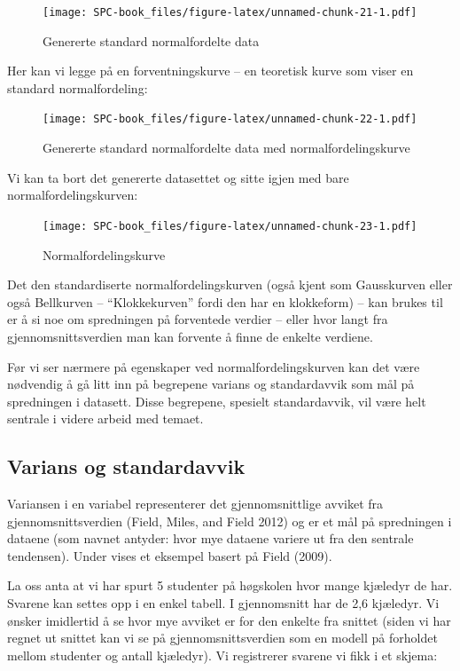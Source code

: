 \documentclass[
]{book}
\begin{document}
\begin{figure}
\centering
\texttt{[image: SPC-book\_files/figure-latex/unnamed-chunk-21-1.pdf]}
\caption{\label{fig:unnamed-chunk-21}Genererte standard normalfordelte data}
\end{figure}

Her kan vi legge på en forventningskurve -- en teoretisk kurve som viser en standard normalfordeling:

\begin{figure}
\centering
\texttt{[image: SPC-book\_files/figure-latex/unnamed-chunk-22-1.pdf]}
\caption{\label{fig:unnamed-chunk-22}Genererte standard normalfordelte data med normalfordelingskurve}
\end{figure}

Vi kan ta bort det genererte datasettet og sitte igjen med bare normalfordelingskurven:

\begin{figure}
\centering
\texttt{[image: SPC-book\_files/figure-latex/unnamed-chunk-23-1.pdf]}
\caption{\label{fig:unnamed-chunk-23}Normalfordelingskurve}
\end{figure}

Det den standardiserte normalfordelingskurven (også kjent som Gausskurven eller også Bellkurven -- ``Klokkekurven'' fordi den har en klokkeform) -- kan brukes til er å si noe om spredningen på forventede verdier -- eller hvor langt fra gjennomsnittsverdien man kan forvente å finne de enkelte verdiene.

Før vi ser nærmere på egenskaper ved normalfordelingskurven kan det være nødvendig å gå litt inn på begrepene varians og standardavvik som mål på spredningen i datasett. Disse begrepene, spesielt standardavvik, vil være helt sentrale i videre arbeid med temaet.

\hypertarget{varians-og-standardavvik}{%
\subsection{Varians og standardavvik}\label{varians-og-standardavvik}}

Variansen i en variabel representerer det gjennomsnittlige avviket fra gjennomsnittsverdien (Field, Miles, and Field 2012) og er et mål på spredningen i dataene (som navnet antyder: hvor mye dataene variere ut fra den sentrale tendensen). Under vises et eksempel basert på Field (2009).

La oss anta at vi har spurt 5 studenter på høgskolen hvor mange kjæledyr de har. Svarene kan settes opp i en enkel tabell. I gjennomsnitt har de 2,6 kjæledyr. Vi ønsker imidlertid å se hvor mye avviket er for den enkelte fra snittet (siden vi har regnet ut snittet kan vi se på gjennomsnittsverdien som en modell på forholdet mellom studenter og antall kjæledyr). Vi registrerer svarene vi fikk i et skjema:
\end{document}
